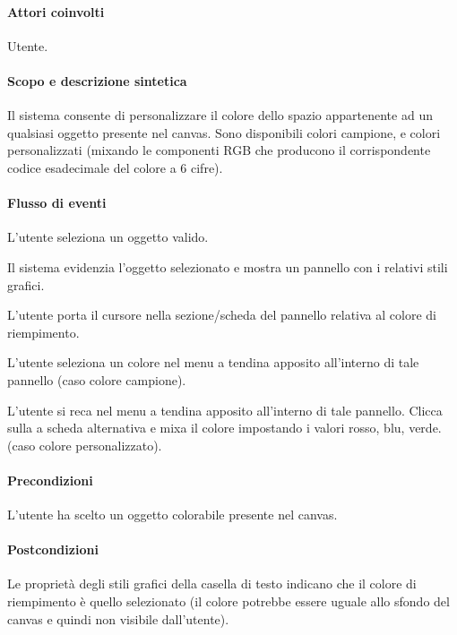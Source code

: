 \paragraph{Attori coinvolti} Utente.
\paragraph{Scopo e descrizione sintetica}   Il sistema consente di personalizzare il colore dello spazio appartenente ad un qualsiasi oggetto presente nel canvas. Sono disponibili colori campione, e colori personalizzati (mixando le componenti RGB che producono il corrispondente codice esadecimale del colore a 6 cifre).
\paragraph{Flusso di eventi}
\begin{elenconumerato}[\textbf{}]{\subsubsecindent}
\item L'utente seleziona un oggetto valido.
\item Il sistema evidenzia l'oggetto selezionato e mostra un pannello con i relativi stili grafici.
\item L'utente porta il cursore nella sezione/scheda del pannello relativa al colore di riempimento.
\item L'utente seleziona un colore nel menu a tendina apposito all'interno di tale pannello (caso colore campione).
\item L'utente si reca nel menu a tendina apposito all'interno di tale pannello. Clicca sulla a scheda alternativa e mixa il colore impostando i valori rosso, blu, verde. (caso colore personalizzato).
\end{elenconumerato}
\paragraph{Precondizioni}L'utente ha scelto un oggetto colorabile presente nel canvas.
\paragraph{Postcondizioni}Le propriet\` a degli stili grafici della casella di testo indicano che il colore di riempimento \` e  quello selezionato (il colore potrebbe essere uguale allo sfondo del canvas e quindi non visibile dall'utente).


